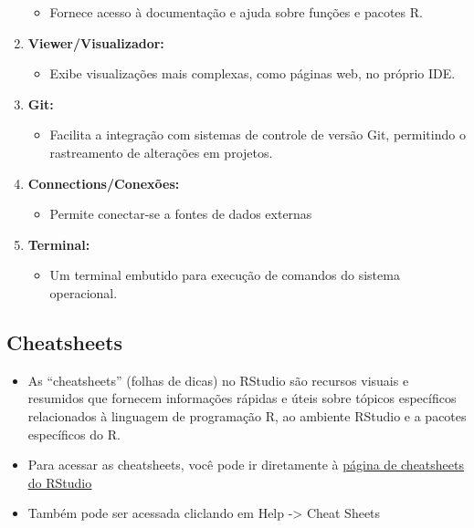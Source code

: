 \documentclass[
  letterpaper,
  DIV=11,
  numbers=noendperiod]{scrartcl}
\providecommand{\tightlist}{%
  \setlength{\itemsep}{0pt}\setlength{\parskip}{0pt}}\usepackage{longtable,booktabs,array}
\begin{document}
\begin{enumerate}
  \begin{itemize}
  \tightlist
  \item
    Fornece acesso à documentação e ajuda sobre funções e pacotes R.
  \end{itemize}
\item
  \textbf{Viewer/Visualizador:}

  \begin{itemize}
  \tightlist
  \item
    Exibe visualizações mais complexas, como páginas web, no próprio
    IDE.
  \end{itemize}
\item
  \textbf{Git:}

  \begin{itemize}
  \tightlist
  \item
    Facilita a integração com sistemas de controle de versão Git,
    permitindo o rastreamento de alterações em projetos.
  \end{itemize}
\item
  \textbf{Connections/Conexões:}

  \begin{itemize}
  \tightlist
  \item
    Permite conectar-se a fontes de dados externas
  \end{itemize}
\item
  \textbf{Terminal:}

  \begin{itemize}
  \tightlist
  \item
    Um terminal embutido para execução de comandos do sistema
    operacional.
  \end{itemize}
\end{enumerate}

\subsection{Cheatsheets}\label{cheatsheets}

\begin{itemize}
\item
  As ``cheatsheets'' (folhas de dicas) no RStudio são recursos visuais e
  resumidos que fornecem informações rápidas e úteis sobre tópicos
  específicos relacionados à linguagem de programação R, ao ambiente
  RStudio e a pacotes específicos do R.
\item
  Para acessar as cheatsheets, você pode ir diretamente à
  \href{https://rstudio.com/resources/cheatsheets/}{\ul{página de
  cheatsheets do RStudio}}
\item
  Também pode ser acessada cliclando em Help -\textgreater{} Cheat
  Sheets
\end{itemize}
\end{document}
